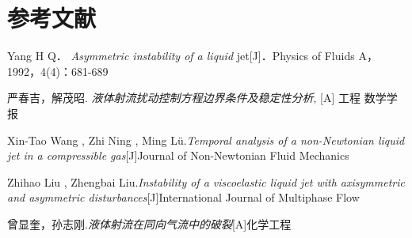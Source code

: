\documentclass[UTF8]{gapd}
\begin{document}
\section*{参考文献}
\begin{thebibliography}{2}

Yang H Q．
\textit{Asymmetric instability of a liquid }jet[J]．Physics of Fluids A，1992，4(4)：681-689 

严春吉，解茂昭. \textit{液体射流扰动控制方程边界条件及稳定性分析}, [A] 工程 数学学报 

 Xin-Tao Wang , Zhi Ning , Ming Lü.\textit{Temporal analysis of a non-Newtonian liquid jet in a compressible gas}[J]Journal of Non-Newtonian Fluid Mechanics 

Zhihao Liu , Zhengbai Liu.\textit{Instability of a viscoelastic liquid jet with axisymmetric and asymmetric disturbances}[J]International Journal of Multiphase Flow

曾显奎，孙志刚.\textit{液体射流在同向气流中的破裂}[A]化学工程
\end{thebibliography}

\end{document}
